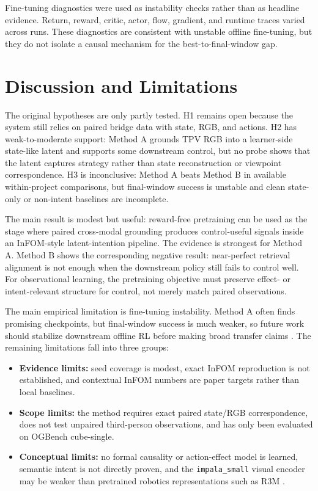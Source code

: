 \documentclass{article}
\begin{document}
Fine-tuning diagnostics were used as instability checks rather than as headline evidence. Return, reward, critic, actor, flow, gradient, and runtime traces varied across runs. These diagnostics are consistent with unstable offline fine-tuning, but they do not isolate a causal mechanism for the best-to-final-window gap.

\section{Discussion and Limitations}

The original hypotheses are only partly tested. H1 remains open because the system still relies on paired bridge data with state, RGB, and actions. H2 has weak-to-moderate support: Method A grounds TPV RGB into a learner-side state-like latent and supports some downstream control, but no probe shows that the latent captures strategy rather than state reconstruction or viewpoint correspondence. H3 is inconclusive: Method A beats Method B in available within-project comparisons, but final-window success is unstable and clean state-only or non-intent baselines are incomplete.

The main result is modest but useful: reward-free pretraining can be used as the stage where paired cross-modal grounding produces control-useful signals inside an InFOM-style latent-intention pipeline. The evidence is strongest for Method A. Method B shows the corresponding negative result: near-perfect retrieval alignment is not enough when the downstream policy still fails to control well. For observational learning, the pretraining objective must preserve effect- or intent-relevant structure for control, not merely match paired observations.

The main empirical limitation is fine-tuning instability. Method A often finds promising checkpoints, but final-window success is much weaker, so future work should stabilize downstream offline RL before making broad transfer claims \citep{Levine2020OfflineRL}. The remaining limitations fall into three groups:
\begin{itemize}[leftmargin=1.5em]
    \item \textbf{Evidence limits:} seed coverage is modest, exact InFOM reproduction is not established, and contextual InFOM numbers are paper targets rather than local baselines.
    \item \textbf{Scope limits:} the method requires exact paired state/RGB correspondence, does not test unpaired third-person observations, and has only been evaluated on OGBench cube-single.
    \item \textbf{Conceptual limits:} no formal causality or action-effect model is learned, semantic intent is not directly proven, and the \texttt{impala\_small} visual encoder may be weaker than pretrained robotics representations such as R3M \citep{Nair2023R3M}.
\end{itemize}
\end{document}
